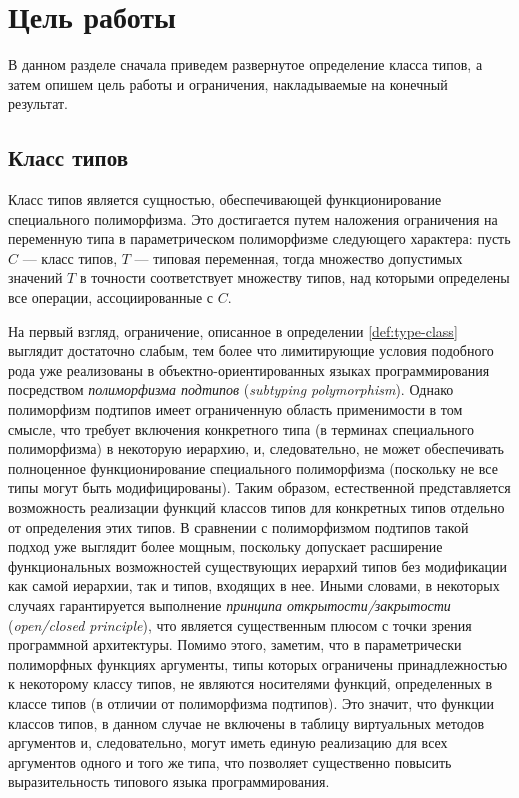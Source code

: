 \chapter{Цель работы}

В данном разделе сначала приведем развернутое определение класса типов, а затем опишем цель работы и ограничения, накладываемые на конечный результат.

\section{Класс типов}

\begin{definition}
Класс типов является сущностью, обеспечивающей функционирование специального полиморфизма. Это достигается путем наложения ограничения на переменную типа в параметрическом полиморфизме следующего характера: пусть $C$ --- класс типов, $T$ --- типовая переменная, тогда множество допустимых значений $T$ в точности соответствует множеству типов, над которыми определены все операции, ассоциированные с $C$.  
\end{definition}

На первый взгляд, ограничение, описанное в определении \ref{def:type-class} выглядит достаточно слабым, тем более что лимитирующие условия подобного рода уже реализованы в объектно-ориентированных языках программирования посредством \emph{полиморфизма подтипов} (\emph{subtyping polymorphism}). Однако полиморфизм подтипов имеет ограниченную область применимости в том смысле, что требует включения конкретного типа (в терминах специального полиморфизма) в некоторую иерархию, и, следовательно, не может обеспечивать полноценное функционирование специального полиморфизма (поскольку не все типы могут быть модифицированы). Таким образом, естественной представляется возможность реализации функций классов типов для конкретных типов отдельно от определения этих типов. В сравнении с полиморфизмом подтипов такой подход уже выглядит более мощным, поскольку допускает расширение функциональных возможностей существующих иерархий типов без модификации как самой иерархии, так и типов, входящих в нее. Иными словами, в некоторых случаях гарантируется выполнение \emph{принципа открытости/закрытости} (\emph{open/closed principle}), что является существенным плюсом с точки зрения программной архитектуры. Помимо этого, заметим, что в параметрически полиморфных функциях аргументы, типы которых ограничены принадлежностью к некоторому классу типов, не являются носителями функций, определенных в классе типов (в отличии от полиморфизма подтипов). Это значит, что функции классов типов, в данном случае не включены в таблицу виртуальных методов аргументов и, следовательно, могут иметь единую реализацию для всех аргументов одного и того же типа, что позволяет существенно повысить выразительность типового языка программирования.

